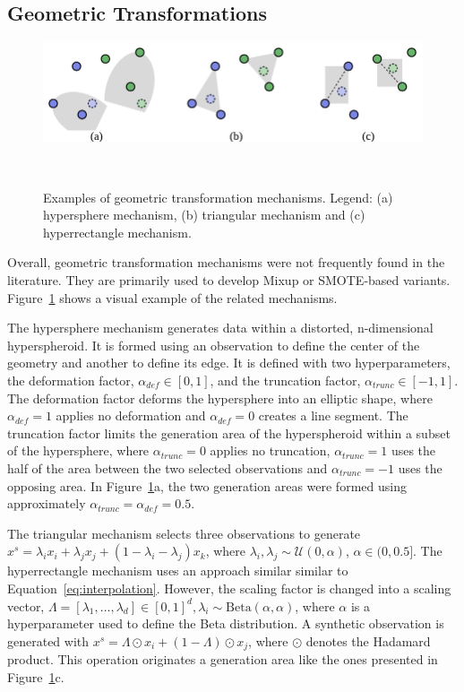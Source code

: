 \documentclass[parskip=full]{scrartcl}
\begin{document}
\subsection{Geometric Transformations}


\begin{figure}
	\centering
	\includegraphics[width=.7\linewidth]{../analysis/geometric-transformations}
    \caption{%
        Examples of geometric transformation mechanisms. Legend: (a)
        hypersphere mechanism, (b) triangular mechanism and (c)
        hyperrectangle mechanism.
    }~\label{fig:geometric-transformations}
\end{figure}

Overall, geometric transformation mechanisms were not frequently found in the
literature. They are primarily used to develop Mixup or SMOTE-based variants.
Figure~\ref{fig:geometric-transformations} shows a visual example of the
related mechanisms.

The hypersphere mechanism generates data within a distorted, n-dimensional
hyperspheroid. It is formed using an observation to define the center of
the geometry and another to define its edge.
It is defined with two hyperparameters, the deformation
factor, $\alpha_{def} \in [0, 1]$, and the truncation factor, $\alpha_{trunc}
\in [-1, 1]$. The deformation factor deforms the hypersphere into an elliptic
shape, where $\alpha_{def}=1$ applies no deformation and $\alpha_{def}=0$
creates a line segment. The truncation factor limits the generation area of
the hyperspheroid within a subset of the hypersphere, where $\alpha_{trunc}=0$
applies no truncation, $\alpha_{trunc}=1$ uses the half of the area between
the two selected observations and $\alpha_{trunc}=-1$ uses the opposing area.
In Figure~\ref{fig:geometric-transformations}a, the two generation areas were
formed using approximately $\alpha_{trunc} = \alpha_{def} = 0.5$.

The triangular mechanism selects three observations to generate $x^s =
\lambda_ix_i + \lambda_jx_j + (1-\lambda_i-\lambda_j)x_k$, where $\lambda_i,
\lambda_j \sim \mathcal{U}(0, \alpha)$, $\alpha \in (0, 0.5]$. The
hyperrectangle mechanism uses an approach similar similar to
Equation~\ref{eq:interpolation}. However, the scaling factor is changed into a
scaling vector, $\Lambda = [\lambda_1,\dots,\lambda_d ] \in [0,1]^d, \lambda_i
\sim \text{Beta}(\alpha, \alpha)$, where $\alpha$ is a hyperparameter used to
define the Beta distribution. A synthetic observation is generated with $x^s =
\Lambda \odot x_i + (1-\Lambda) \odot x_j$, where $\odot$ denotes the Hadamard
product. This operation originates a generation area like the ones presented
in Figure~\ref{fig:geometric-transformations}c.
\end{document}
